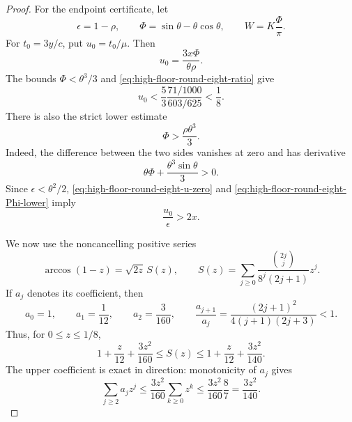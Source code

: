 \documentclass[11pt]{article}
\theoremstyle{remark}
\begin{document}
\begin{proof}
For the endpoint certificate, let
\[
 \epsilon=1-\rho,\qquad
 \Phi=\sin\theta-\theta\cos\theta,\qquad
 W=K\frac{\Phi}{\pi}.
\]
For $t_0=3y/c$, put $u_0=t_0/\mu$.  Then
\begin{equation}
 u_0=\frac{3x\Phi}{\theta\rho}.
 \label{eq:high-floor-round-eight-u-zero}
\end{equation}
The bounds $\Phi<\theta^3/3$ and
\eqref{eq:high-floor-round-eight-ratio} give
\begin{equation}
 u_0<\frac53\frac{71/1000}{603/625}<\frac18.
 \label{eq:high-floor-round-eight-u-upper}
\end{equation}
There is also the strict lower estimate
\begin{equation}
 \Phi>\frac{\rho\theta^3}{3}.
 \label{eq:high-floor-round-eight-Phi-lower}
\end{equation}
Indeed, the difference between the two sides vanishes at zero and has
derivative
\[
 \theta\Phi+\frac{\theta^3\sin\theta}{3}>0.
\]
Since $\epsilon<\theta^2/2$,
\eqref{eq:high-floor-round-eight-u-zero} and
\eqref{eq:high-floor-round-eight-Phi-lower} imply
\begin{equation}
 \frac{u_0}{\epsilon}>2x.
 \label{eq:high-floor-round-eight-retained-range}
\end{equation}

We now use the noncancelling positive series
\begin{equation}
 \arccos(1-z)=\sqrt{2z}\,S(z),\qquad
 S(z)=\sum_{j\geq0}
 \frac{\binom{2j}{j}}{8^j(2j+1)}z^j.
 \label{eq:high-floor-round-eight-arccos-series}
\end{equation}
If $a_j$ denotes its coefficient, then
\[
 a_0=1,\qquad a_1=\frac1{12},\qquad a_2=\frac3{160},
 \qquad
 \frac{a_{j+1}}{a_j}
 =\frac{(2j+1)^2}{4(j+1)(2j+3)}<1.
\]
Thus, for $0\leq z\leq1/8$,
\begin{equation}
 1+\frac z{12}+\frac{3z^2}{160}
 \leq S(z)
 \leq1+\frac z{12}+\frac{3z^2}{140}.
 \label{eq:high-floor-round-eight-series-bounds}
\end{equation}
The upper coefficient is exact in direction: monotonicity of $a_j$
gives
\[
 \sum_{j\geq2}a_jz^j
 \leq\frac{3z^2}{160}\sum_{k\geq0}z^k
 \leq\frac{3z^2}{160}\frac87
 =\frac{3z^2}{140}.
\]


\end{proof}
\end{document}
